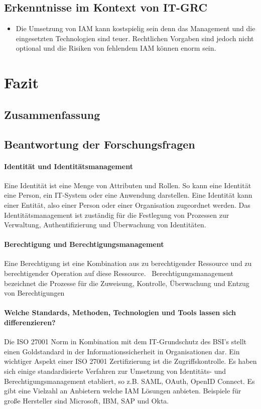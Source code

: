 \documentclass[12pt]{article}
\begin{document}
\subsection{Erkenntnisse im Kontext von IT-GRC}
\begin{itemize}
  \item Die Umsetzung von IAM kann kostspielig sein denn das Management und die eingesetzten Technologien sind teuer. Rechtlichen Vorgaben sind jedoch nicht optional und die Risiken von fehlendem IAM können enorm sein.
\end{itemize}
\section{Fazit}
\subsection{Zusammenfassung}
\subsection{Beantwortung der Forschungsfragen}
\paragraph{Identität und Identitätsmanagement}
Eine Identität ist eine Menge von Attributen und Rollen. So kann eine Identität eine Person, ein IT-System oder eine Anwendung darstellen. Eine Identität kann einer Entität, also einer Person oder einer Organisation zugeordnet werden. Das Identitätsmanagement ist zuständig für die Festlegung von Prozessen zur Verwaltung, Authentifizierung und Überwachung von Identitäten.~\cite{tsolkas2017}~\cite{benantar2005access}
\paragraph{Berechtigung und Berechtigungsmanagement}
Eine Berechtigung ist eine Kombination aus zu berechtigender Ressource und zu berechtigender Operation auf diese Ressource.~\cite{tsolkas2017} Berechtigungsmanagement bezeichnet die Prozesse für die Zuweisung, Kontrolle, Überwachung und Entzug von Berechtigungen~\cite{orp4}
\paragraph{Welche Standards, Methoden, Technologien und Tools lassen sich differenzieren?}
Die ISO 27001 Norm in Kombination mit dem IT-Grundschutz des BSI's stellt einen Goldstandard in der Informationssicherheit in Organisationen dar. Ein wichtiger Aspekt einer ISO 27001 Zertifizierung ist die Zugriffskontrolle.  Es haben sich einige standardisierte Verfahren zur Umsetzung von Identitäts- und Berechtigungsmanagement etabliert, so z.B. SAML, OAuth, OpenID Connect. Es gibt eine Vielzahl an Anbietern welche IAM Lösungen anbieten. Beispiele für große Hersteller sind Microsoft, IBM, SAP und Okta.
\end{document}
